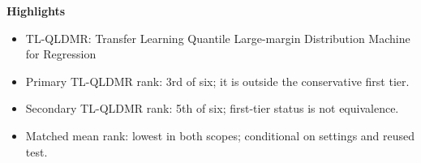 \documentclass[11pt,a4paper]{article}
\begin{document}
\begin{center}
    \textbf{Highlights}
\end{center}

\begin{itemize}
    \item TL-QLDMR: Transfer Learning Quantile Large-margin Distribution Machine for Regression
    \item Primary TL-QLDMR rank: 3rd of six; it is outside the conservative first tier.
    \item Secondary TL-QLDMR rank: 5th of six; first-tier status is not equivalence.
    \item Matched mean rank: lowest in both scopes; conditional on settings and reused test.
\end{itemize}
\end{document}
